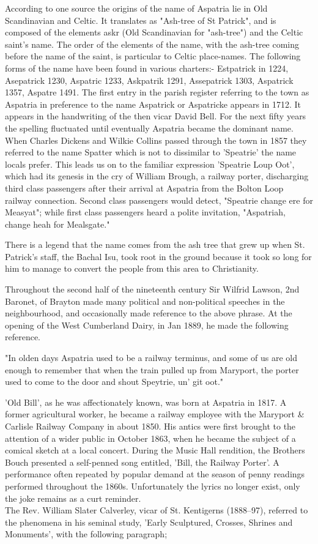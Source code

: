 According to one source the origins of the name of Aspatria lie in Old
Scandinavian and Celtic. It translates as "Ash-tree of St Patrick", and
is composed of the elements askr (Old Scandinavian for "ash-tree") and
the Celtic saint's name. The order of the elements of the name, with the
ash-tree coming before the name of the saint, is particular to Celtic
place-names. The following forms of the name have been found in various
charters:- Estpatrick in 1224, Asepatrick 1230, Aspatric 1233, Askpatrik
1291, Assepatrick 1303, Aspatrick 1357, Aspatre 1491. The first entry in
the parish register referring to the town as Aspatria in preference to
the name Aspatrick or Aspatricke appears in 1712. It appears in the
handwriting of the then vicar David Bell. For the next fifty years the
spelling fluctuated until eventually Aspatria became the dominant name.
When Charles Dickens and Wilkie Collins passed through the town in 1857
they referred to the name Spatter which is not to dissimilar to
'Speatrie' the name locals prefer. This leads us on to the familiar
expression 'Speatrie Loup Oot', which had its genesis in the cry of
William Brough, a railway porter, discharging third class passengers
after their arrival at Aspatria from the Bolton Loop railway connection.
Second class passengers would detect, "Speatrie change ere for Measyat";
while first class passengers heard a polite invitation, "Aspatriah,
change heah for Mealsgate."

There is a legend that the name comes from the ash tree that grew up
when St. Patrick's staff, the Bachal Isu, took root in the ground
because it took so long for him to manage to convert the people from
this area to Christianity.

Throughout the second half of the nineteenth century Sir Wilfrid Lawson,
2nd Baronet, of Brayton made many political and non-political speeches
in the neighbourhood, and occasionally made reference to the above
phrase. At the opening of the West Cumberland Dairy, in Jan 1889, he
made the following reference.

"In olden days Aspatria used to be a railway terminus, and some of us
are old enough to remember that when the train pulled up from Maryport,
the porter used to come to the door and shout Speytrie, un' git oot."

'Old Bill', as he was affectionately known, was born at Aspatria in
1817. A former agricultural worker, he became a railway employee with
the Maryport \& Carlisle Railway Company in about 1850. His antics were
first brought to the attention of a wider public in October 1863, when
he became the subject of a comical sketch at a local concert. During the
Music Hall rendition, the Brothers Bouch presented a self-penned song
entitled, 'Bill, the Railway Porter'. A performance often repeated by
popular demand at the season of penny readings performed throughout the
1860s. Unfortunately the lyrics no longer exist, only the joke remains
as a curt reminder.\\
The Rev. William Slater Calverley, vicar of St. Kentigerns (1888--97),
referred to the phenomena in his seminal study, 'Early Sculptured,
Crosses, Shrines and Monuments', with the following paragraph;

